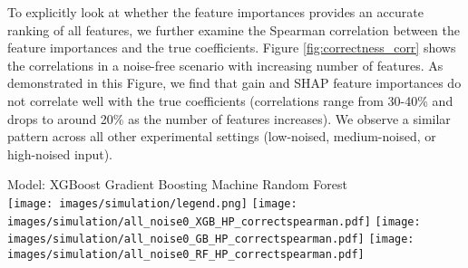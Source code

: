 To explicitly look at whether the feature importances provides an accurate ranking of all features, we further examine the Spearman correlation between the feature importances and the true coefficients. Figure \ref{fig:correctness_corr} shows the correlations in a noise-free scenario with increasing number of features. As demonstrated in this Figure, we find that gain and SHAP feature importances do not correlate well with the true coefficients (correlations range from 30-40\% and drops to around 20\% as the number of features increases). We observe a similar pattern across all other experimental settings (low-noised, medium-noised, or high-noised input).


 \begin{figure*}[h]
  \centering
  \vspace{0.2cm}
  Model: \hspace{1cm} XGBoost \hspace{1.5cm} Gradient Boosting Machine \hspace{0.7cm} Random Forest \\ 
  \texttt{[image: images/simulation/legend.png]}
  \texttt{[image: images/simulation/all\_noise0\_XGB\_HP\_correctspearman.pdf]}
  \texttt{[image: images/simulation/all\_noise0\_GB\_HP\_correctspearman.pdf]}
  \texttt{[image: images/simulation/all\_noise0\_RF\_HP\_correctspearman.pdf]}
 
  \caption{Spearman correlation of gain and SHAP feature importances (Blue: gain, Orange: SHAP) with the true coefficients with no noise added in simulation. Correlation is quite low across all settings.}%
  \label{fig:correctness_corr}
\end{figure*}

